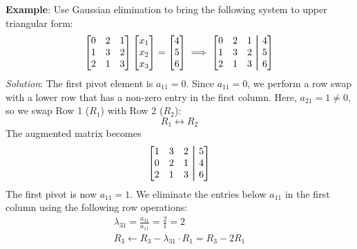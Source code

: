 \begin{exampleBox}
    \textbf{Example}: Use Gaussian elimination to bring the following system to upper triangular form:
    \begin{equation*}
        \begin{bmatrix}
            0 & 2 & 1 \\
            1 & 3 & 2 \\
            2 & 1 & 3
        \end{bmatrix}
        \begin{bmatrix}
            x_1 \\ x_2 \\ x_3
        \end{bmatrix}
        =
        \begin{bmatrix}
            4 \\ 5 \\ 6
        \end{bmatrix}
        \implies
        \begin{bmatrix}
            0 & 2 & 1 &\aug& 4 \\
            1 & 3 & 2 &\aug& 5 \\
            2 & 1 & 3 &\aug& 6
        \end{bmatrix}
    \end{equation*}
    \emph{Solution}: The first pivot element is $ a_{11} = 0 $. Since $ a_{11} = 0 $, we perform a row swap with a lower row that has a non-zero entry in the first column. Here, $ a_{21} = 1 \neq 0 $, so we swap Row 1 ($ R_1 $) with Row 2 ($ R_2 $):
    \begin{equation*}
        R_1 \leftrightarrow R_2
    \end{equation*}
    The augmented matrix becomes
    \begin{equation*}
        \begin{bmatrix}
            1 & 3 & 2 &\aug& 5 \\
            0 & 2 & 1 &\aug& 4 \\
            2 & 1 & 3 &\aug& 6
        \end{bmatrix}
    \end{equation*}
    The first pivot is now $ a_{11} = 1 $. We eliminate the entries below $ a_{11} $ in the first column using the following row operations:
    \begin{gather*}
        \lambda_{31} = \frac{a_{31}}{a_{11}} = \frac{2}{1} = 2 \\
        R_3 \leftarrow R_3 - \lambda_{31} \cdot R_1 = R_3 - 2R_1
    \end{gather*}

\end{exampleBox}
